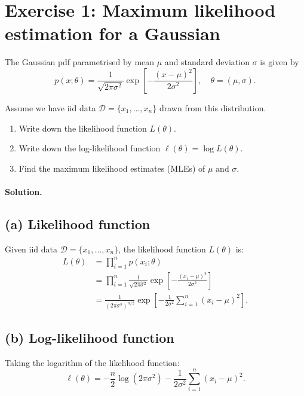\documentclass[11pt]{article}
\newif\ifshowanswers
\begin{document}
\section*{Exercise 1: Maximum likelihood estimation for a Gaussian}

The Gaussian pdf parametrised by mean $\mu$ and standard deviation $\sigma$ is given by
\[
p(x; \theta) = \frac{1}{\sqrt{2\pi \sigma^2}} \exp\left[ -\frac{(x - \mu)^2}{2\sigma^2} \right], \quad \theta = (\mu, \sigma).
\]

\noindent
Assume we have iid data $\mathcal{D} = \{x_1, \dots, x_n\}$ drawn from this distribution.
\begin{enumerate}[label=(\alph*)]
  \item Write down the likelihood function $L(\theta)$.
  \item Write down the log-likelihood function $\ell(\theta) = \log L(\theta)$.
  \item Find the maximum likelihood estimates (MLEs) of $\mu$ and $\sigma$.
\end{enumerate}


\ifshowanswers
  \paragraph{Solution.}

\subsection*{(a) Likelihood function}

Given iid data $\mathcal{D} = \{x_1, \dots, x_n\}$, the likelihood function $L(\theta)$ is:
\begin{align}
L(\theta) &= \prod_{i=1}^n p(x_i; \theta) \\
&= \prod_{i=1}^n \frac{1}{\sqrt{2\pi \sigma^2}} \exp\left[ -\frac{(x_i - \mu)^2}{2\sigma^2} \right] \\
&= \frac{1}{(2\pi \sigma^2)^{n/2}} \exp\left[ -\frac{1}{2\sigma^2} \sum_{i=1}^n (x_i - \mu)^2 \right].
\end{align}

\subsection*{(b) Log-likelihood function}

Taking the logarithm of the likelihood function:
\[
\ell(\theta) = -\frac{n}{2} \log(2\pi \sigma^2) - \frac{1}{2\sigma^2} \sum_{i=1}^n (x_i - \mu)^2.
\]
\end{document}
